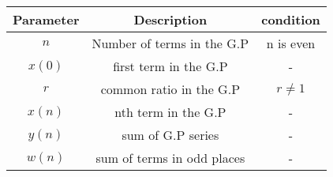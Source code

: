 
\begin{tabular}{|c|c|c|}
\hline
Parameter & Description & condition\\
\hline
\( n \) & Number of terms in the G.P & n is even \\
\hline
\(x(0) \) & first term in the G.P & -\\
\hline
\( r \) & common ratio in the G.P & $r \neq 1$ \\
\hline
\( x(n) \) & nth term in the G.P & -\\
\hline
\( y(n) \) & sum of G.P series & -\\
\hline
\( w(n) \) & sum of terms in odd places & -\\
\hline
\end{tabular}



